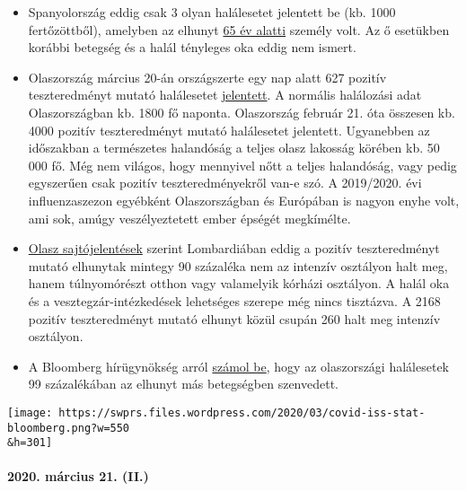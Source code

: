 \begin{itemize}
\tightlist
\item
  Spanyolország eddig csak 3 olyan halálesetet jelentett be (kb. 1000
  fertőzöttből), amelyben az elhunyt
  \href{https://www.20minutos.es/noticia/4193883/0/media-edad-coronavirus-espana/}{65
  év alatti} személy volt. Az ő esetükben korábbi betegség és a halál
  tényleges oka eddig nem ismert.
\item
  Olaszország március 20-án országszerte egy nap alatt 627 pozitív
  teszteredményt mutató halálesetet
  \href{https://www.msn.com/en-au/news/coronavirus/italy-coronavirus-deaths-surge-by-627-in-a-day-lifting-total-death-toll-to-4032/ar-BB11tDnS}{jelentett}.
  A normális halálozási adat Olaszországban kb. 1800 fő naponta.
  Olaszország február 21. óta összesen kb. 4000 pozitív teszteredményt
  mutató halálesetet jelentett. Ugyanebben az időszakban a természetes
  halandóság a teljes olasz lakosság körében kb. 50 000 fő. Még nem
  világos, hogy mennyivel nőtt a teljes halandóság, vagy pedig
  egyszerűen csak pozitív teszteredményekről van-e szó. A 2019/2020. évi
  influenzaszezon egyébként Olaszországban és Európában is nagyon enyhe
  volt, ami sok, amúgy veszélyeztetett ember épségét megkímélte.
\item
  \href{https://www.tgcom24.mediaset.it/cronaca/coronavirus-in-lombardia-9-morti-su-10-mai-giunti-in-terapia-intensiva_16362350-202002a.shtml}{Olasz
  sajtójelentések} szerint Lombardiában eddig a pozitív teszteredményt
  mutató elhunytak mintegy 90 százaléka nem az intenzív osztályon halt
  meg, hanem túlnyomórészt otthon vagy valamelyik kórházi osztályon. A
  halál oka és a vesztegzár-intézkedések lehetséges szerepe még nincs
  tisztázva. A 2168 pozitív teszteredményt mutató elhunyt közül csupán
  260 halt meg intenzív osztályon.
\item
  A Bloomberg hírügynökség arról
  \href{https://www.bloomberg.com/news/articles/2020-03-18/99-of-those-who-died-from-virus-had-other-illness-italy-says}{számol
  be}, hogy az olaszországi halálesetek 99 százalékában az elhunyt más
  betegségben szenvedett.
\end{itemize}

\texttt{[image: https://swprs.files.wordpress.com/2020/03/covid-iss-stat-bloomberg.png?w=550\\\&h=301]}

\hypertarget{2020-muxe1rcius-21-ii}{%
\paragraph{2020. március 21. (II.)}\label{2020-muxe1rcius-21-ii}}

